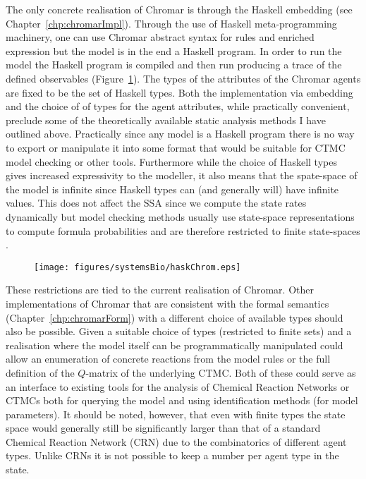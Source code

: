 The only concrete realisation of Chromar is through the Haskell embedding (see
Chapter~\ref{chp:chromarImpl}). Through the use of Haskell meta-programming
machinery, one can use Chromar abstract syntax for rules and enriched expression
but the model is in the end a Haskell program. In order to run the model the
Haskell program is compiled and then run producing a trace of the defined
observables (Figure~\ref{fig:haskChrom}). The types of the attributes of the
Chromar agents are fixed to be the set of Haskell types. Both the implementation
via embedding and the choice of of types for the agent attributes, while
practically convenient, preclude some of the theoretically available static
analysis methods I have outlined above. Practically since any model is a Haskell
program there is no way to export or manipulate it into some format that would
be suitable for CTMC model checking or other tools. Furthermore while the choice
of Haskell types gives increased expressivity to the modeller, it also means
that the spate-space of the model is infinite since Haskell types can (and
generally will) have infinite values. This does not affect the SSA since we
compute the state rates dynamically but model checking methods usually use
state-space representations to compute formula probabilities and are therefore
restricted to finite state-spaces \cite[see for example PRISM
tool;][]{Kwiatkowska_Norman_Parker_2011}.

\begin{figure}
    \centering
    \texttt{[image: figures/systemsBio/haskChrom.eps]}
    \caption{}
    \label{fig:haskChrom}
\end{figure}

These restrictions are tied to the current realisation of Chromar. Other
implementations of Chromar that are consistent with the formal semantics
(Chapter~\ref{chp:chromarForm}) with a different choice of available types
should also be possible. Given a suitable choice of types (\eg restricted to
finite sets) and a realisation where the model itself can be programmatically
manipulated could allow an enumeration of concrete reactions from the model
rules or the full definition of the $Q$-matrix of the underlying CTMC. Both of
these could serve as an interface to existing tools for the analysis of Chemical
Reaction Networks or CTMCs both for querying the model and using identification
methods (\eg for model parameters). It should be noted, however, that even with
finite types the state space would generally still be significantly larger than
that of a standard Chemical Reaction Network (CRN) due to the combinatorics of
different agent types. Unlike CRNs it is not possible to keep a number per agent
type in the state.

